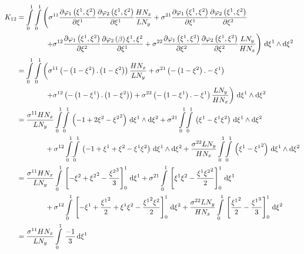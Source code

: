 \begin{equation}
  \begin{aligned}
    K_{12}&=\dintl{0}{1}\dintl{0}{1}\left(
    \conductivitytensorsymbol^{11}\delby{\lbfn{1}{\xione,\xitwo}}{\xione}
    \delby{\lbfn{2}{\xione,\xitwo}}{\xione}\dfrac{H N_{x}}{L N_{y}}+
    \conductivitytensorsymbol^{21}\delby{\lbfn{1}{\xione,\xitwo}}{\xione}
    \delby{\lbfn{2}{\xione,\xitwo}}{\xitwo}\right.\\
    &\qquad\qquad\left.+\conductivitytensorsymbol^{12}\delby{\lbfn{1}{\xione,\xitwo}}{\xitwo}
    \delby{\lbfn{2}{\beta}{\xione,\xitwo}}{\xione}+
    \conductivitytensorsymbol^{22}\delby{\lbfn{1}{\xione,\xitwo}}{\xitwo}
    \delby{\lbfn{2}{\xione,\xitwo}}{\xitwo}\dfrac{L N_{y}}{H N_{x}}\right)\infinitesimaltwo{\xione}{\xitwo}\\
    &=\dintl{0}{1}\dintl{0}{1}\left(
    \conductivitytensorsymbol^{11}\pbrac{-\pbrac{1-\xitwo}.\pbrac{1-\xitwo}}\dfrac{H N_{x}}{L N_{y}}+
    \conductivitytensorsymbol^{21}\pbrac{-\pbrac{1-\xitwo}.-\xione}\right.\\
    &\qquad\qquad\left.+\conductivitytensorsymbol^{12}\pbrac{-\pbrac{1-\xione}.\pbrac{1-\xitwo}}+
    \conductivitytensorsymbol^{22}\pbrac{-\pbrac{1-\xione}.-\xione}\dfrac{L N_{y}}{H N_{x}}\right)
    \infinitesimaltwo{\xione}{\xitwo}\\
    &=\dfrac{\conductivitytensorsymbol^{11} H N_{x}}{L N_{y}}\giint{0}{1}{0}{1}{\pbrac{-1+2\xitwo-\xitwosq}}{\xione}{\xitwo}
    +\conductivitytensorsymbol^{21}\giint{0}{1}{0}{1}{\pbrac{\xione-\xione\xitwo}}{\xione}{\xitwo}\\
    &\qquad\qquad+\conductivitytensorsymbol^{12}\giint{0}{1}{0}{1}{\pbrac{-1+\xione+\xitwo-\xione\xitwo}}{\xione}{\xitwo}
    +\dfrac{\conductivitytensorsymbol^{22} L N_{y}}{H N_{x}}\giint{0}{1}{0}{1}{\pbrac{\xione-\xionesq}}{\xione}{\xitwo} \\
    &=\dfrac{\conductivitytensorsymbol^{11} H N_{x}}{L N_{y}}\gint{0}{1}{\sqbrac{-\xitwo+\xitwosq-\dfrac{\xitwocube}{3}}^{1}_{0}}{\xione}
    +\conductivitytensorsymbol^{21}\gint{0}{1}{\sqbrac{\xione\xitwo-\dfrac{\xione\xitwosq}{2}}^{1}_{0}}{\xione}\\
    &\qquad\qquad+\conductivitytensorsymbol^{12}\gint{0}{1}{\sqbrac{-\xione+\dfrac{\xionesq}{2}+\xione\xitwo-\dfrac{\xionesq\xitwo}{2}}^{1}_{0}}{\xitwo}
    +\dfrac{\conductivitytensorsymbol^{22} L N_{y}}{H N_{x}}\gint{0}{1}{\sqbrac{\dfrac{\xionesq}{2}-\dfrac{\xionecube}{3}}^{1}_{0}}{\xitwo} \\
    &=\dfrac{\conductivitytensorsymbol^{11} H N_{x}}{L N_{y}}\gint{0}{1}{\dfrac{-1}{3}}{\xione}

\end{aligned}
\end{equation}
